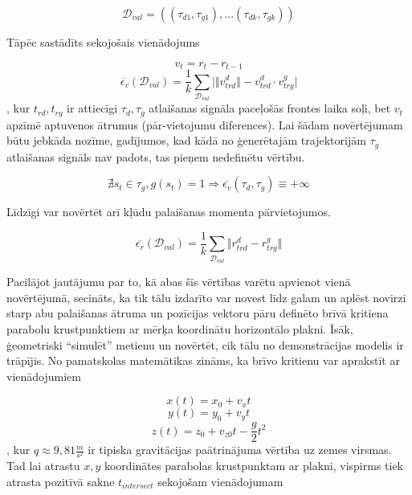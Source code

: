 \documentclass[12pt, a4paper]{article}
\numberwithin{equation}{section} %
\begin{document}
\begin{equation}
    \mathcal{D}_{val} = \left (  (\tau_{d1}, \tau_{g1}), ...
     (\tau_{dk}, \tau_{gk}) \right )
\end{equation}

Tāpēc sastādīts sekojošais vienādojums

\begin{equation}
    v_t = r_t - r_{t-1}
\end{equation}
\begin{equation}
    \overline{\epsilon_v}(\mathcal{D}_{val}) = \frac{1}{k} \sum_{\mathcal{D}_{val}}
    \vert \Vert v^d_{trd} \Vert - v^d_{trd} \cdot v^g_{trg} \vert 
\end{equation}
, kur $t_{rd}, t_{rg}$ ir attiecīgi $\tau_{d}, \tau_{g}$ atlaišanas signāla paceļošās frontes laika soļi, bet $v_t$ apzīmē aptuvenos ātrumus (pār-vietojumu diferences). Lai šādam novērtējumam būtu jebkāda nozīme, gadījumos, kad kādā no ģenerētajām trajektorijām $\tau_{g}$ atlaišanas signāls nav padots, tas pieņem nedefinētu vērtību.

\begin{equation}
    \nexists s_t \in \tau_{g}, g(s_t) = 1 
    \Rightarrow
    \overline{\epsilon_v}(\tau_{d},\tau_{g}) \equiv +\infty 
\end{equation}

Līdzīgi var novērtēt arī kļūdu palaišanas momenta pārvietojumos.

\begin{equation}
    \overline{\epsilon_r}(\mathcal{D}_{val}) = \frac{1}{k} \sum_{\mathcal{D}_{val}}
    \Vert r^d_{trd} - r^g_{trg} \Vert 
\end{equation}

Pacilājot jautājumu par to, kā abas šīs vērtības varētu apvienot vienā novērtējumā, secināts, ka tik tālu izdarīto var novest līdz galam un aplēst novirzi starp abu palaišanas ātruma un pozīcijas vektoru pāru definēto brīvā kritiena parabolu krustpunktiem ar mērķa koordinātu horizontālo plakni. Īsāk, ģeometriski ``simulēt'' metienu un novērtēt, cik tālu no demonstrācijas modelis ir trāpījis. No pamatskolas matemātikas zināms, ka brīvo kritienu var aprakstīt ar vienādojumiem

\begin{equation}
    x(t) = x_0 + v_xt 
\end{equation}
\begin{equation}
    y(t) = y_0 + v_yt 
\end{equation}
\begin{equation}
    z(t) = z_0 + v_{z0}t - \frac{g}{2}t^2 
\end{equation}
, kur $q \approx 9,81 \frac{m}{s^2}$ ir tipiska gravitācijas paātrinājuma vērtība uz zemes virsmas. Tad lai atrastu $x,y$ koordinātes parabolas krustpunktam ar plakni, vispirms tiek atrasta pozitīvā sakne $t_{intersect}$ sekojošam vienādojumam
\end{document}
